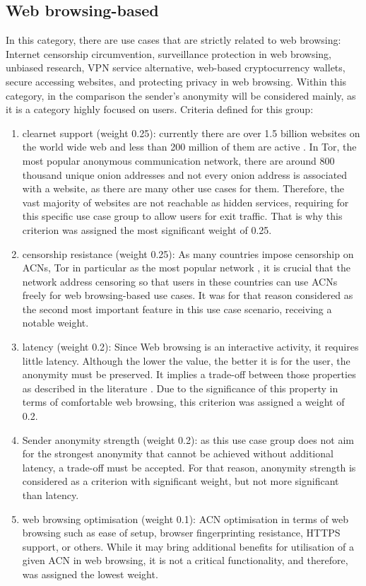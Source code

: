 \subsection{Web browsing-based}
In this category, there are use cases that are strictly related to web browsing: Internet censorship circumvention, surveillance protection in web browsing, unbiased research, VPN service alternative, web-based cryptocurrency wallets, secure accessing websites, and protecting privacy in web browsing.
Within this category, in the comparison the sender's anonymity will be considered mainly, as it is a category highly focused on users.
Criteria defined for this group:
\begin{enumerate}
    \item clearnet support (weight 0.25): currently there are over 1.5 billion websites on the world wide web and less than 200 million of them are active \cite{internetlivestats}. In Tor, the most popular anonymous communication network, there are around 800 thousand unique onion addresses \cite{tor-metrics, tor-metrics2} and not every onion address is associated with a website, as there are many other use cases for them. Therefore, the vast majority of websites are not reachable as hidden services, requiring for this specific use case group to allow users for exit traffic. That is why this criterion was assigned the most significant weight of 0.25.
    \item censorship resistance (weight 0.25): As many countries impose censorship on ACNs, Tor in particular as the most popular network \cite{gfw-china, africa}, it is crucial that the network address censoring so that users in these countries can use ACNs freely for web browsing-based use cases. It was for that reason considered as the second most important feature in this use case scenario, receiving a notable weight.
    \item latency (weight 0.2): Since Web browsing is an interactive activity, it requires little latency. Although the lower the value, the better it is for the user, the anonymity must be preserved. It implies a trade-off between those properties as described in the literature \cite{tor-design}. Due to the significance of this property in terms of comfortable web browsing, this criterion was assigned a weight of 0.2.
    \item Sender anonymity strength (weight 0.2): as this use case group does not aim for the strongest anonymity that cannot be achieved without additional latency, a trade-off must be accepted. For that reason, anonymity strength is considered as a criterion with significant weight, but not more significant than latency.
    \item web browsing optimisation (weight 0.1): ACN optimisation in terms of web browsing such as ease of setup, browser fingerprinting resistance, HTTPS support, or others. While it may bring additional benefits for utilisation of a given ACN in web browsing, it is not a critical functionality, and therefore, was assigned the lowest weight.
\end{enumerate}

